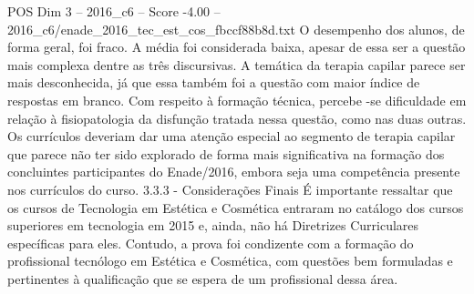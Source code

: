 \begin{textsample}{POS Dim 3 – 2016\_c6 – Score -4.00 – 2016\_c6/enade\_2016\_tec\_est\_cos\_fbccf88b8d.txt}
O desempenho dos alunos, de forma geral, foi fraco.
A média foi considerada baixa, apesar de essa ser a questão mais complexa dentre as três discursivas.
A temática da terapia capilar parece ser mais desconhecida, já que essa também foi a questão com maior índice de respostas em branco.
Com respeito à formação técnica, percebe -se dificuldade em relação à fisiopatologia da disfunção tratada nessa questão, como nas duas outras.
Os currículos deveriam dar uma atenção especial ao segmento de terapia capilar que parece não ter sido explorado de forma mais significativa na formação dos concluintes participantes do Enade/2016, embora seja uma competência presente nos currículos do curso. 3.3.3 - Considerações Finais É importante ressaltar que os cursos de Tecnologia em Estética e Cosmética entraram no catálogo dos cursos superiores em tecnologia em 2015 e, ainda, não há Diretrizes Curriculares específicas para eles.
Contudo, a prova foi condizente com a formação do profissional tecnólogo em Estética e Cosmética, com questões bem formuladas e pertinentes à qualificação que se espera de um profissional dessa área.

\end{textsample}
